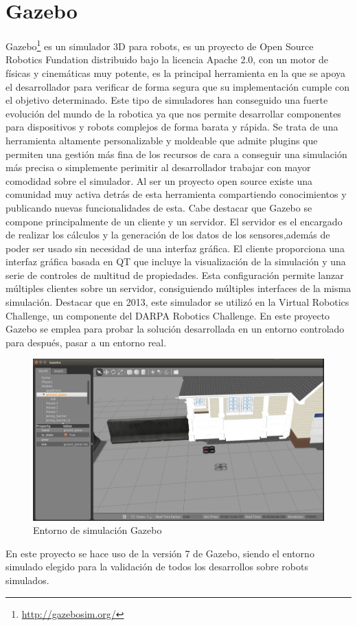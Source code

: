 \section{Gazebo}
\label{sec:gazebo}
Gazebo\footnote{\url{http://gazebosim.org/}} es un simulador 3D para robots, es un proyecto de Open Source Robotics Fundation distribuido bajo la licencia Apache 2.0, con un motor de físicas y cinemáticas muy potente, es la principal herramienta en la que se apoya el desarrollador para verificar de forma segura que su implementación cumple con el objetivo determinado. Este tipo de simuladores han conseguido una fuerte evolución del mundo de la robotica ya que nos permite desarrollar componentes para dispositivos y robots complejos de forma barata y rápida.
Se trata de una herramienta altamente personalizable y moldeable que admite plugins que permiten una gestión más fina de los recursos de cara a conseguir una simulación más precisa o simplemente perimitir al desarrollador trabajar con mayor comodidad sobre el simulador.
Al ser un proyecto open source existe una comunidad muy activa detrás de esta herramienta compartiendo conocimientos y publicando nuevas funcionalidades de esta.
Cabe destacar que Gazebo se compone principalmente de un cliente y un servidor. El
servidor es el encargado de realizar los cálculos y la generación de los datos de los sensores,además de poder ser usado sin necesidad de una interfaz gráfica.
El cliente proporciona una interfaz gráfica basada en QT que incluye la visualización de la simulación y una serie de controles de multitud de propiedades. Esta configuración permite lanzar múltiples clientes sobre un servidor, consiguiendo múltiples interfaces de la misma simulación.
Destacar que en 2013, este simulador se utilizó en la Virtual Robotics Challenge, un componente del DARPA Robotics Challenge.
En este proyecto Gazebo se emplea para probar la solución desarrollada en un entorno controlado para después, pasar a un entorno real. \\

\begin{figure}[H]
    \centering
    \includegraphics[scale=0.50]{img/gazebo.PNG}
  	\caption{Entorno de simulación Gazebo}
  	\label{fig:gazebo}
\end{figure}

En este proyecto se hace uso de la versión 7 de Gazebo, siendo el entorno simulado elegido para la validación de todos los desarrollos sobre robots simulados.